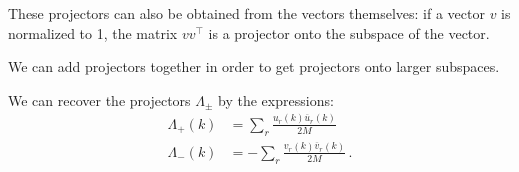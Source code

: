 \documentclass[main.tex]{subfiles}
\begin{document}
These projectors can also be obtained from the vectors themselves: if a vector \(v\) is normalized to 1, the matrix \(v v ^{\top}\) is a projector onto the subspace of the vector.

We can add projectors together in order to get projectors onto larger subspaces.

\begin{claim}
We can recover the projectors \(\Lambda_{\pm }\) by the expressions: 
%
\begin{subequations} \label{eq:energy-projectors-spinor}
\begin{align}
\Lambda_{+} (k) &= \sum_{r} \frac{u_r(k) \overline{u}_{r} (k)}{2M} \\
\Lambda_{-} (k) &= - \sum_{r} \frac{v_r(k) \overline{v}_{r} (k)}{2M} 
\,.
\end{align}
\end{subequations}
\end{claim}
\end{document}
